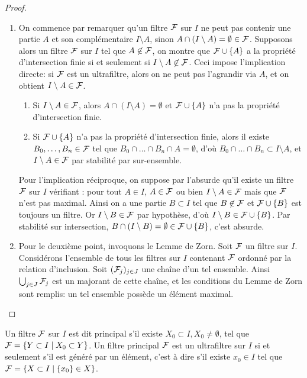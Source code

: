 \begin{proof}
\begin{enumerate}
\item On commence par remarquer qu'un filtre $\mathcal{F}$ sur $I$ ne peut pas contenir une partie $A$ et son complémentaire $I \setminus A$,
sinon $A \cap (I \setminus A) = \emptyset \in \mathcal{F}$. Supposons alors un filtre $\mathcal{F}$ sur $I$ tel que $A \not\in \mathcal{F}$, on montre que
$\mathcal{F} \cup \{A\}$ a la propriété d'intersection finie si et seulement si $I \setminus A \not\in \mathcal{F}$. Ceci impose l'implication directe: si $\mathcal{F}$ est
un ultrafiltre, alors on ne peut pas l'agrandir via $A$, et on obtient $I \setminus A \in \mathcal{F}$.
\begin{enumerate}[label= (\roman*)]
\item Si $I \setminus A \in \mathcal{F}$, alors $A \cap (I \setminus A) = \emptyset$ et $\mathcal{F} \cup \{A\}$ n'a pas la propriété d'intersection finie.
\item Si $\mathcal{F} \cup \{A\}$ n'a pas la propriété d'intersection finie,
alors il existe $B_0,\dots,B_n \in \mathcal{F}$ tel que $B_0 \cap \dots \cap B_n \cap A = \emptyset$, d'où $B_0 \cap \dots \cap B_n \subset I \setminus A$,
et $I \setminus A \in \mathcal{F}$ par stabilité par sur-ensemble.
\end{enumerate}
Pour l'implication réciproque, on suppose par l'absurde qu'il existe un filtre $\mathcal{F}$ sur $I$ vérifiant : pour tout $A \in I$, $A \in \mathcal{F}$ ou bien
$I \setminus A \in \mathcal{F}$ mais que $\mathcal{F}$ n'est pas maximal. Ainsi on a une partie $B \subset I$ tel que $B \not\in \mathcal{F}$ et $\mathcal{F} \cup \{B\}$ est toujours un filtre.
Or $I \setminus B \in \mathcal{F}$ par hypothèse, d'où $I \setminus B \in \mathcal{F} \cup \{B\}$. Par stabilité sur intersection, $B \cap (I \setminus B) = \emptyset \in \mathcal{F} \cup \{B\}$, 
c'est absurde.
\item Pour le deuxième point, invoquons le Lemme de Zorn. Soit $\mathcal{F}$ un filtre sur $I$. Considérons l'ensemble de tous les filtres sur $I$ contenant $\mathcal{F}$ ordonné par 
la relation d'inclusion. Soit $(\mathcal{F}_j)_{j \in J}$ une chaîne d'un tel ensemble. Ainsi $\bigcup_{j \in J} \mathcal{F}_j$ est un majorant de cette chaîne, et les conditions du
Lemme de Zorn sont remplis: un tel ensemble possède un élément maximal.
\end{enumerate}
\end{proof}

\begin{exem}
Un filtre $\mathcal{F}$ sur $I$ est dit principal s'il existe $X_0 \subset I, X_0 \ne \emptyset$, tel que $\mathcal{F} = \{ Y \subset I \mid X_0 \subset Y \}$.
Un filtre principal $\mathcal{F}$ est un ultrafiltre sur $I$ si et seulement s'il est généré par un élément, c'est à dire s'il existe $x_0 \in I$
tel que $\mathcal{F} = \{ X \subset I \mid \{x_0\} \in X \}$.
\end{exem}

